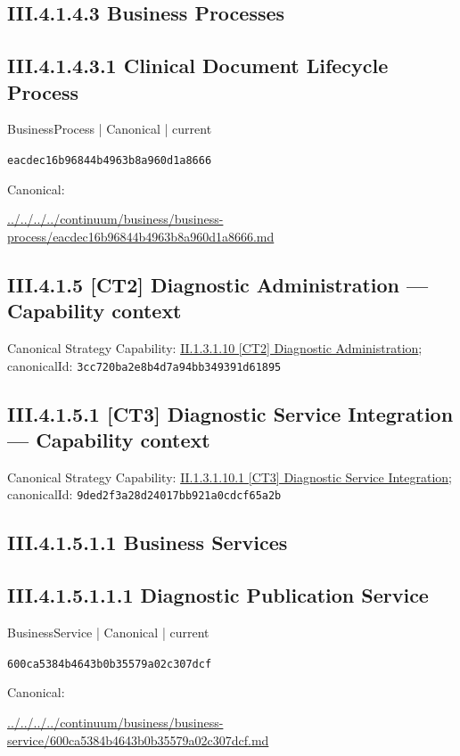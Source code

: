 \documentclass[10pt,a4paper]{article}
\begin{document}
\subsection*{III.4.1.4.3 Business Processes}
\subsection*{III.4.1.4.3.1 Clinical Document Lifecycle Process}
\label{element-eacdec16b96844b4963b8a960d1a8666}
{\small BusinessProcess | Canonical | current}\par
\texttt{eacdec16b96844b4963b8a960d1a8666}\par
Canonical: \par
{\footnotesize\url{../../../../continuum/business/business-process/eacdec16b96844b4963b8a960d1a8666.md}}\par
\subsection*{III.4.1.5 [CT2] Diagnostic Administration — Capability context}
Canonical Strategy Capability: \hyperref[element-3cc720ba2e8b4d7a94bb349391d61895]{II.1.3.1.10 [CT2] Diagnostic Administration}; canonicalId: \texttt{3cc720ba2e8b4d7a94bb349391d61895}\par
\subsection*{III.4.1.5.1 [CT3] Diagnostic Service Integration — Capability context}
Canonical Strategy Capability: \hyperref[element-9ded2f3a28d24017bb921a0cdcf65a2b]{II.1.3.1.10.1 [CT3] Diagnostic Service Integration}; canonicalId: \texttt{9ded2f3a28d24017bb921a0cdcf65a2b}\par
\subsection*{III.4.1.5.1.1 Business Services}
\subsection*{III.4.1.5.1.1.1 Diagnostic Publication Service}
\label{element-600ca5384b4643b0b35579a02c307dcf}
{\small BusinessService | Canonical | current}\par
\texttt{600ca5384b4643b0b35579a02c307dcf}\par
Canonical: \par
{\footnotesize\url{../../../../continuum/business/business-service/600ca5384b4643b0b35579a02c307dcf.md}}\par
\end{document}
